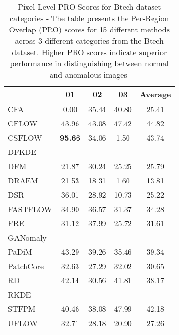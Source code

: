\begin{table}[h!]
    \centering
    \captionsetup{justification=raggedright}
        \begin{tabular}{l*{4}{c}}
        \toprule
         & 01 & 02 & 03 & Average \\
        \midrule
        CFA & 0.00 & 35.44 & 40.80 & 25.41 \\
        CFLOW & 43.96 & 43.08 & 47.42 & 44.82 \\
        CSFLOW & \textbf{95.66} & 34.06 & 1.50 & 43.74 \\
        DFKDE & - & - & - & - \\
        DFM & 21.87 & 30.24 & 25.25 & 25.79 \\
        DRAEM & 21.53 & 18.31 & 1.60 & 13.81 \\
        DSR & 36.01 & 28.92 & 10.73 & 25.22 \\
        FASTFLOW & 34.90 & 36.57 & 31.37 & 34.28 \\
        FRE & 31.12 & 37.99 & 25.72 & 31.61 \\
        GANomaly & - & - & - & - \\
        PaDiM & 43.29 & 39.26 & 35.46 & 39.34 \\
        PatchCore & 32.63 & 27.29 & 32.02 & 30.65 \\
        RD & 42.14 & 30.56 & 41.81 & 38.17 \\
        RKDE & - & - & - & - \\
        STFPM & 40.46 & 38.08 & 47.99 & 42.18 \\
        UFLOW & 32.71 & 28.18 & 20.90 & 27.26 \\
        \bottomrule
        \end{tabular}
    \caption{Pixel Level PRO Scores for Btech\cite{Bergmann_2022_mvtec3d} dataset categories - The table presents the Per-Region Overlap (PRO) scores for 15 different methods across 3 different categories from the Btech dataset. Higher PRO scores indicate superior performance in distinguishing between normal and anomalous images.}
    \label{table:Btech Pixel PRO}
\end{table}